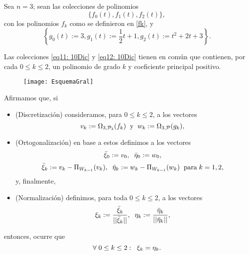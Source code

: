 \begin{ejemplo}
Sea $n=3$; sean las colecciones de polinomios
\begin{equation}
\label{eq11: 10Dic}
\{
f_{0}(t), 
f_{1}(t), f_{2}(t) \},
\end{equation}
con los polinomios $f_{k}$ como se definieron en \eqref{fk}, y
\begin{equation}
\label{eq12: 10Dic}
\left\{
g_{0}(t):=3,  
g_{1}(t):=\frac{1}{2}t+1,
g_{2}(t):=t^{2}+2t+3 \right\}.
\end{equation}

Las colecciones \eqref{eq11: 10Dic} y \eqref{eq12: 10Dic}
tienen en común que contienen, por cada $0 \leq k \leq 2$,
un polinomio de grado $k$ y coeficiente principal positivo.


\begin{figure}[H]
	\centering
	\texttt{[image: EsquemaGral]} 
\end{figure}	

Afirmamos que, si
\begin{itemize}
\item \textcolor{ameMorado}{{(Discretización)}}
consideramos, para $0 \leq k \leq 2$, a los vectores
\[
v_{k}:= \Omega_{3, \mathcal{P}_{3}}(f_{k})
\hspace{0.2cm} \text{y} \hspace{0.2cm}
w_{k}:= \Omega_{3, \mathcal{P}}(g_{k}),
\]
\item \textcolor{ameMorado}{{(Ortogonalización)}}
en base a estos definimos a los vectores
$$ \bar{\xi}_{0}:= v_{0}, 
\hspace{0.2cm} \bar{\eta}_{0}:= w_{0}, 
$$
$$ \bar{\xi}_{k}:= v_{k} - \Pi_{W_{k-1}}(v_{k}), \hspace{0.2cm}
\bar{\eta}_{k}:= w_{k} - \Pi_{W_{k-1}}(w_{k})
\hspace{0.2cm} \text{para} 
\hspace{0.1cm}
k=1,2, $$ y, finalmente, 
\item \textcolor{ameMorado}{{(Normalización)}}
definimos, para toda $0 \leq k \leq 2$,
a los vectores
$$\xi_{k}:= \frac{\bar{\xi}_{k}}{|| \bar{\xi}_{k} ||},
\hspace{0.2cm}
\eta_{k}:= \frac{\bar{\eta}_{k}}{|| \bar{\eta}_{k} ||},
$$
\end{itemize}
entonces, ocurre que
\[
\forall \hspace{0.1cm} 0 \leq k \leq 2:
\hspace{0.2cm} \xi_{k}= \eta_{k}.
\]
\final
\end{ejemplo}

